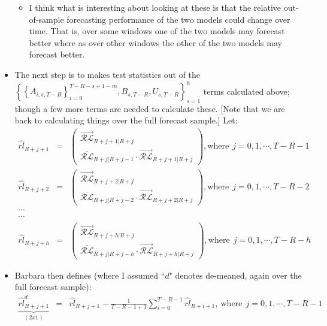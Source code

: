 \documentclass[11pt]{article}
\begin{document}
\begin{itemize}
\begin{itemize}
\item  I think what is interesting about looking at these is that the relative out-of-sample forecasting performance of the two models could change over time.  That is, over some windows one of the two models may forecast better where as over other windows the other of the two models may forecast better. 
\end{itemize}
\item The next step is to makes test statistics out of the $\left\{\left\{A_{i,s,T-R}\right\}_{i=0}^{T-R-s+1-m},B_{s,T-R},U_{s,T-R}\right\}_{s=1}^{h}$
terms calculated above; though a few more terms are needed to calculate these. [Note that we are back to calculating things over the full forecast sample.]  Let:
\begin{eqnarray}
\widehat{rl}_{R+j+1}\!\!\!\!&=&\!\!\!\! \left(\begin{array}{c} \overrightarrow{\mathcal{RL}}_{R+j+1|R+j} \\ \overline{\mathcal{RL}}_{R+j|R+j-1}\cdot\overrightarrow{\mathcal{RL}}_{R+j+1|R+j} \end{array} \right),
\textrm{where} \ \ j=0, 1, \cdots, T-R-1
\nonumber \\
\widehat{rl}_{R+j+2}\!\!\!\!&=&\!\!\!\! \left(\begin{array}{c} \overrightarrow{\mathcal{RL}}_{R+j+2|R+j} \\ \overline{\mathcal{RL}}_{R+j|R+j-2}\cdot\overrightarrow{\mathcal{RL}}_{R+j+2|R+j} \end{array} \right),
\textrm{where} \ \ j=0, 1, \cdots, T-R-2
\nonumber \\
\cdots
\nonumber \\
\cdots
\nonumber \\
\widehat{rl}_{R+j+h}\!\!\!\!&=&\!\!\!\! \left(\begin{array}{c} \overrightarrow{\mathcal{RL}}_{R+j+h|R+j} \\ \overline{\mathcal{RL}}_{R+j|R+j-h}\cdot\overrightarrow{\mathcal{RL}}_{R+j+h|R+j} \end{array} \right),
\textrm{where} \ \ j=0, 1, \cdots, T-R-h
\nonumber
\end{eqnarray}
\item Barbara then defines (where I assumed ``$d$" denotes de-meaned, again over the full forecast sample):
\begin{eqnarray}
\underbrace{\widehat{rl}^{d}_{R+j+1}}_{(2x1)}\!\!\!\!&=&\!\!\!\!\widehat{rl}_{R+j+1}-\frac{1}{T-R-1+1}\sum_{i=0}^{T-R-1}\widehat{rl}_{R+i+1}, \ \textrm{where} \ \ j=0, 1, \cdots, T-R-1 \nonumber \\

\end{eqnarray}
\end{itemize}
\end{document}
